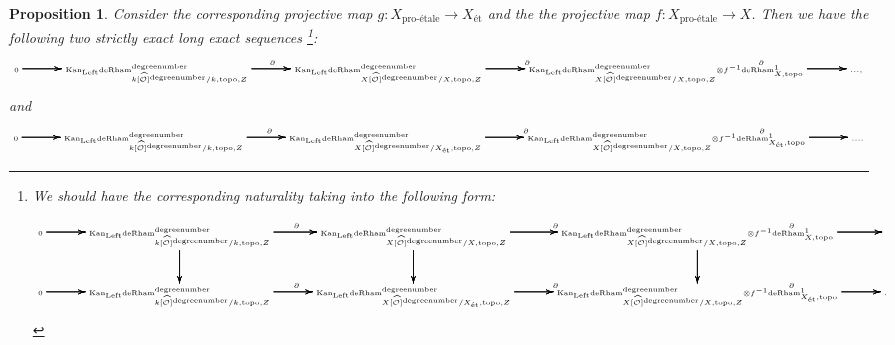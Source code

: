 \documentclass[11pt]{book}
\newtheorem{proposition}[theorem]{Proposition}
\theoremstyle{definition}
\numberwithin{equation}{section}
\begin{document}
\newpage

\begin{landscape}
\begin{proposition}
Consider the corresponding projective map $g:X_{\text{pro-\'etale}}\rightarrow X_{\text{\'et}}$ and the the projective map $f:X_{\text{pro-\'etale}}\rightarrow X$. Then we have the following two strictly exact long exact sequences 
\footnote{We should have the corresponding naturality taking into the following form:

\[\tiny
\xymatrix@C+0.4pc@R+0pc{
0\ar[r]\ar[r]\ar[r] \ar[r] &\mathrm{Kan}_\mathrm{Left}\mathrm{deRham}^\text{degreenumber}_{k[\widehat{\mathcal{O}}]^\text{degreenumber}/k,\mathrm{topo},Z}\ar[d]\ar[d]\ar[d] \ar[d] \ar[r]^\partial\ar[r]\ar[r] \ar[r] &\mathrm{Kan}_\mathrm{Left}\mathrm{deRham}^\text{degreenumber}_{X[\widehat{\mathcal{O}}]^\text{degreenumber}/X,\mathrm{topo},Z} \ar[d]\ar[d]\ar[d] \ar[d]\ar[r]^\partial\ar[r]\ar[r] \ar[r] &\mathrm{Kan}_\mathrm{Left}\mathrm{deRham}^\text{degreenumber}_{X[\widehat{\mathcal{O}}]^\text{degreenumber}/X,\mathrm{topo},Z}{\otimes}f^{-1} \mathrm{deRham}^1_{X,\mathrm{topo}} \ar[d]\ar[d]\ar[d] \ar[d]\ar[r]^\partial\ar[r]\ar[r] \ar[r]&\\
0\ar[r]\ar[r]\ar[r] \ar[r] &\mathrm{Kan}_\mathrm{Left}\mathrm{deRham}^\text{degreenumber}_{k[\widehat{\mathcal{O}}]^\text{degreenumber}/k,\mathrm{topo},Z} \ar[r]^\partial\ar[r]\ar[r] \ar[r] &\mathrm{Kan}_\mathrm{Left}\mathrm{deRham}^\text{degreenumber}_{X[\widehat{\mathcal{O}}]^\text{degreenumber}/X_{\text{\'et}},\mathrm{topo},Z} \ar[r]^\partial\ar[r]\ar[r] \ar[r] &\mathrm{Kan}_\mathrm{Left}\mathrm{deRham}^\text{degreenumber}_{X[\widehat{\mathcal{O}}]^\text{degreenumber}/X,\mathrm{topo},Z}{\otimes}f^{-1} \mathrm{deRham}^1_{X_{\text{\'et}},\mathrm{topo}} \ar[r]^\partial\ar[r]\ar[r] \ar[r]&.
}
\]
}:
\[\tiny
\xymatrix@C+0.4pc@R+0pc{
0\ar[r]\ar[r]\ar[r] \ar[r] &\mathrm{Kan}_\mathrm{Left}\mathrm{deRham}^\text{degreenumber}_{k[\widehat{\mathcal{O}}]^\text{degreenumber}/k,\mathrm{topo},Z} \ar[r]^\partial\ar[r]\ar[r] \ar[r] &\mathrm{Kan}_\mathrm{Left}\mathrm{deRham}^\text{degreenumber}_{X[\widehat{\mathcal{O}}]^\text{degreenumber}/X,\mathrm{topo},Z} \ar[r]^\partial\ar[r]\ar[r] \ar[r] &\mathrm{Kan}_\mathrm{Left}\mathrm{deRham}^\text{degreenumber}_{X[\widehat{\mathcal{O}}]^\text{degreenumber}/X,\mathrm{topo},Z}{\otimes}f^{-1} \mathrm{deRham}^1_{X,\mathrm{topo}} \ar[r]^\partial\ar[r]\ar[r] \ar[r]&...,
}
\]
and
\[\tiny
\xymatrix@C+0.4pc@R+0pc{
0\ar[r]\ar[r]\ar[r] \ar[r] &\mathrm{Kan}_\mathrm{Left}\mathrm{deRham}^\text{degreenumber}_{k[\widehat{\mathcal{O}}]^\text{degreenumber}/k,\mathrm{topo},Z} \ar[r]^\partial\ar[r]\ar[r] \ar[r] &\mathrm{Kan}_\mathrm{Left}\mathrm{deRham}^\text{degreenumber}_{X[\widehat{\mathcal{O}}]^\text{degreenumber}/X_{\text{\'et}},\mathrm{topo},Z} \ar[r]^\partial\ar[r]\ar[r] \ar[r] &\mathrm{Kan}_\mathrm{Left}\mathrm{deRham}^\text{degreenumber}_{X[\widehat{\mathcal{O}}]^\text{degreenumber}/X,\mathrm{topo},Z}{\otimes}f^{-1} \mathrm{deRham}^1_{X_{\text{\'et}},\mathrm{topo}} \ar[r]^\partial\ar[r]\ar[r] \ar[r] &....
}
\]
\end{proposition}




\end{landscape}
\end{document}
